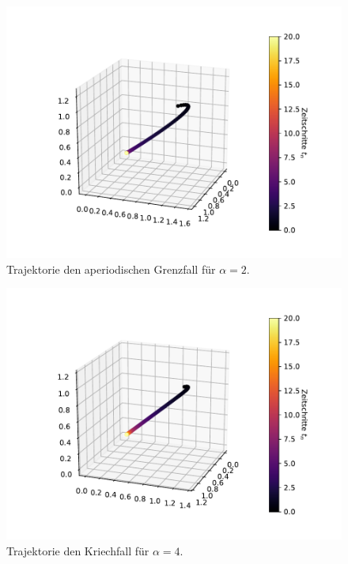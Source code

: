 \begin{figure}[H]
  \centering
  \includegraphics[scale=0.7]{A2/plots/aufg1_a2.pdf}
  \caption{Trajektorie den aperiodischen Grenzfall für $\alpha = 2$.}
  \label{fig:Aperiodisch}
\end{figure}

\begin{figure}[H]
  \centering
  \includegraphics[scale=0.7]{A2/plots/aufg1_a3.pdf}
  \caption{Trajektorie den Kriechfall für $\alpha = 4$.}
  \label{fig:Kriech}
\end{figure}

